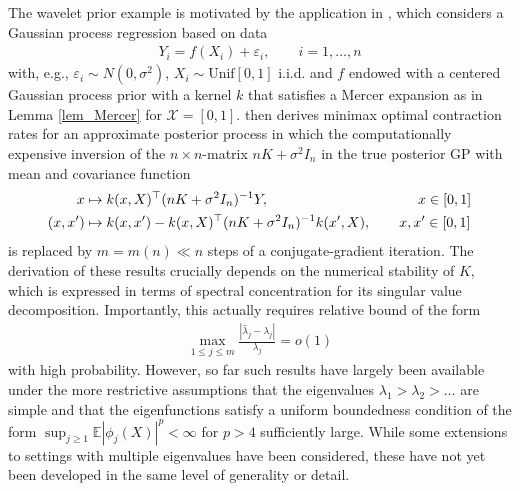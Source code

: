 \documentclass[a4paper,11pt]{article} %
\numberwithin{equation}{section}
\theoremstyle{definition}
\theoremstyle{remark}
\theoremstyle{plain}
\begin{document}
The wavelet prior example is motivated by the application in \cite{StankewitzSzabo24}, which considers a Gaussian process regression based on data
\begin{align}
  Y_{i} = f(X_{i}) + \varepsilon_{i}, \qquad i = 1, \dots, n
\end{align}
with, e.g., \( \varepsilon_{i} \sim N(0, \sigma^{2}) \), \( X_{i} \sim \text{Unif}[0, 1] \) i.i.d. and \( f \) endowed with a centered Gaussian process prior with a kernel \( k \) that satisfies a Mercer expansion as in Lemma \ref{lem_Mercer} for $ \mathcal{X}=[0, 1] $.
\cite{StankewitzSzabo24} then derives minimax optimal contraction rates for an approximate posterior process in which the computationally expensive inversion of the \( n \times n \)-matrix \( n K + \sigma^{2} I_n \) in the true posterior GP with mean and covariance function
\begin{align}
  x       & \mapsto k(x, X)^{\top} (n K + \sigma^{2} I_n)^{-1} Y,
  \qquad \qquad \qquad \qquad \qquad \ \ x \in [0, 1] \\
  (x, x') & \mapsto k(x, x') - k(x, X)^{\top} (n K + \sigma^{2} I_n)^{-1} k(x', X),
  \qquad x, x' \in [0, 1]
  \notag 
\end{align}
is replaced by \( m = m(n) \ll n \) steps of a conjugate-gradient iteration.
The derivation of these results crucially depends on the numerical stability of \( K \), which is expressed in terms of spectral concentration for its singular value decomposition.
Importantly, this actually requires relative bound of the form
\begin{align}
  \label{eq_Expls_UniformControlOverSVD}
  \max_{1\leq j\leq m}\frac{|\widehat{\lambda}_{j} - \lambda_{j}|}{\lambda_{j}} = o(1)
\end{align}
with high probability. However, so far such results have largely been available under the more restrictive assumptions that the eigenvalues \( \lambda_{1} > \lambda_{2} > \dots \) are simple and that the eigenfunctions satisfy a uniform boundedness condition of the form $\sup_{j \ge 1} \mathbb{E} |\phi_{j}(X)|^{p} < \infty$ for \( p > 4 \) sufficiently large.
While some extensions to settings with multiple eigenvalues have been considered, these have not yet been developed in the same level of generality or detail.
\end{document}
